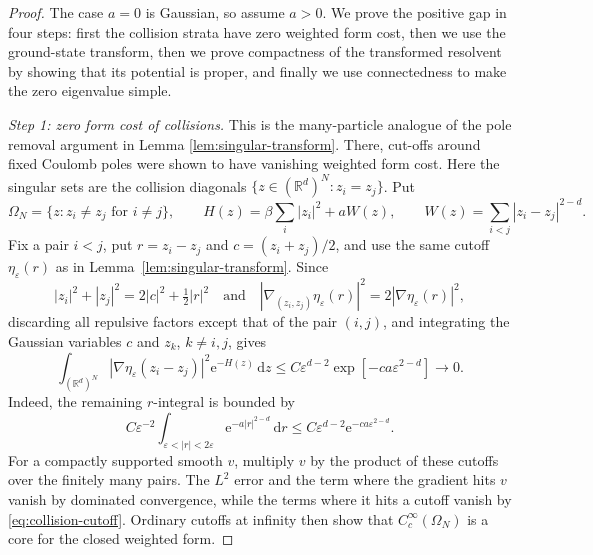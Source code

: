 \documentclass[12pt,reqno,letterpaper]{amsart}
\theoremstyle{definition}
\theoremstyle{remark}
\numberwithin{equation}{section}
\newcommand{\R}{\mathbb R}
\newcommand{\dd}{\,\mathrm d}
\newcommand{\ee}{\mathrm e}
\newcommand{\be}{\beta}
\begin{document}
\begin{proof}
The case \(a=0\) is Gaussian, so assume \(a>0\).  We prove the positive gap
in four steps: first the collision strata have zero weighted form cost, then
we use the ground-state transform, then we prove compactness of the transformed
resolvent by showing that its potential is proper, and finally we use
connectedness to make the zero eigenvalue simple.

\emph{Step 1: zero form cost of collisions.} This is the many-particle analogue of the pole removal argument in
Lemma \ref{lem:singular-transform}.
There, cut-offs around fixed Coulomb
poles were shown to have vanishing weighted form cost. Here the singular
sets are the collision diagonals $\{z\in(\R^d)^N:z_i=z_j\}$. 
Put
\begin{equation*}
 \Omega_N=\{z:z_i\ne z_j\text{ for }i\ne j\},
 \qquad
 H(z)=\be\sum_i|z_i|^2+aW(z),
 \qquad
 W(z)=\sum_{i<j}|z_i-z_j|^{2-d}.
\end{equation*}
Fix a pair \(i<j\), put \(r=z_i-z_j\) and
\(c=(z_i+z_j)/2\), and use the same cutoff \(\eta_\varepsilon(r)\) as in
Lemma~\ref{lem:singular-transform}.  Since
\[
 |z_i|^2+|z_j|^2=2|c|^2+\tfrac12|r|^2
 \quad\text{and}\quad
 |\nabla_{(z_i,z_j)}\eta_\varepsilon(r)|^2
 =2|\nabla\eta_\varepsilon(r)|^2,
\]
discarding all repulsive factors except that of the pair \((i,j)\), and
integrating the Gaussian variables \(c\) and \(z_k\), \(k\ne i,j\), gives
\begin{equation}\label{eq:collision-cutoff}
 \int_{(\R^d)^N}|\nabla\eta_\varepsilon(z_i-z_j)|^2
 \ee^{-H(z)}\dd z
 \le C\varepsilon^{d-2}
       \exp[-c a\varepsilon^{2-d}]\longrightarrow0.
\end{equation}
Indeed, the remaining \(r\)-integral is bounded by
\[
 C\varepsilon^{-2}
 \int_{\varepsilon<|r|<2\varepsilon}
 \ee^{-a|r|^{2-d}}\dd r
 \le C\varepsilon^{d-2}\ee^{-ca\varepsilon^{2-d}}.
\]
For a compactly supported smooth \(v\), multiply \(v\) by the product of
these cutoffs over the finitely many pairs.  The \(L^2\) error and the term
where the gradient hits \(v\) vanish by dominated convergence, while the
terms where it hits a cutoff vanish by \eqref{eq:collision-cutoff}.  Ordinary
cutoffs at infinity then show that \(C_c^\infty(\Omega_N)\) is a core for
the closed weighted form.


\end{proof}
\end{document}
